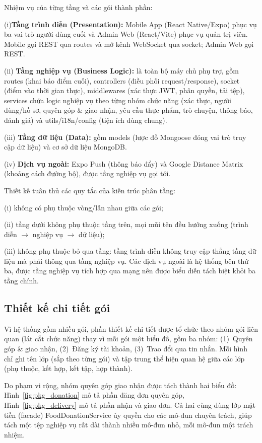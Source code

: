 \documentclass[../main.tex]{subfiles}%
\begin{document}
Nhiệm vụ của từng tầng và các gói thành phần:

(i)\textbf{Tầng trình diễn (Presentation):} Mobile App (React Native/Expo) phục vụ ba vai trò người dùng cuối và Admin Web (React/Vite) phục vụ quản trị viên. Mobile gọi REST qua routes và mở kênh WebSocket qua socket; Admin Web gọi REST.
  
(ii) \textbf{Tầng nghiệp vụ (Business Logic):} là toàn bộ máy chủ phụ trợ, gồm routes (khai báo điểm cuối), controllers (điều phối request/response), socket (điểm vào thời gian thực), middlewares (xác thực JWT, phân quyền, tải tệp), services chứa logic nghiệp vụ theo từng nhóm chức năng (xác thực, người dùng/hồ sơ, quyên góp \& giao nhận, yêu cầu thực phẩm, trò chuyện, thông báo, đánh giá) và utils/i18n/config (tiện ích dùng chung).
  
(iii) \textbf{Tầng dữ liệu (Data):} gồm models (lược đồ Mongoose đóng vai trò truy cập dữ liệu) và cơ sở dữ liệu MongoDB.

(iv) \textbf{Dịch vụ ngoài:} Expo Push (thông báo đẩy) và Google Distance Matrix (khoảng cách đường bộ), được tầng nghiệp vụ gọi tới.

Thiết kế tuân thủ các quy tắc của kiến trúc phân tầng: 

(i) không có phụ thuộc vòng/lẫn nhau giữa các gói; 

(ii) tầng dưới không phụ thuộc tầng trên, mọi mũi tên đều hướng xuống (trình diễn $\rightarrow$ nghiệp vụ $\rightarrow$ dữ liệu); 

(iii) không phụ thuộc bỏ qua tầng: tầng trình diễn không truy cập thẳng tầng dữ liệu mà phải thông qua tầng nghiệp vụ. Các dịch vụ ngoài là hệ thống bên thứ ba, được tầng nghiệp vụ tích hợp qua mạng nên được biểu diễn tách biệt khỏi ba tầng chính.

\subsection{Thiết kế chi tiết gói}
\label{subsection:4.1.3}

Vì hệ thống gồm nhiều gói, phần thiết kế chi tiết được tổ chức theo nhóm gói liên quan (lát cắt chức năng) thay vì mỗi gói một biểu đồ, gồm ba nhóm: (1)~Quyên góp \& giao nhận, (2)~Đăng ký tài khoản, (3)~Trao đổi qua tin nhắn. Mỗi hình chỉ ghi tên lớp (sắp theo từng gói) và tập trung thể hiện quan hệ giữa các lớp (phụ thuộc, kết hợp, kết tập, hợp thành).

Do phạm vi rộng, nhóm quyên góp giao nhận được tách thành hai biểu đồ: Hình~\ref{fig:pkg_donation} mô tả phần đăng đơn quyên góp, Hình~\ref{fig:pkg_delivery} mô tả phần nhận và giao đơn. Cả hai cùng dùng lớp mặt tiền (facade) FoodDonationService ủy quyền cho các mô-đun chuyên trách, giúp tách một tệp nghiệp vụ rất dài thành nhiều mô-đun nhỏ, mỗi mô-đun một trách nhiệm.
\end{document}
